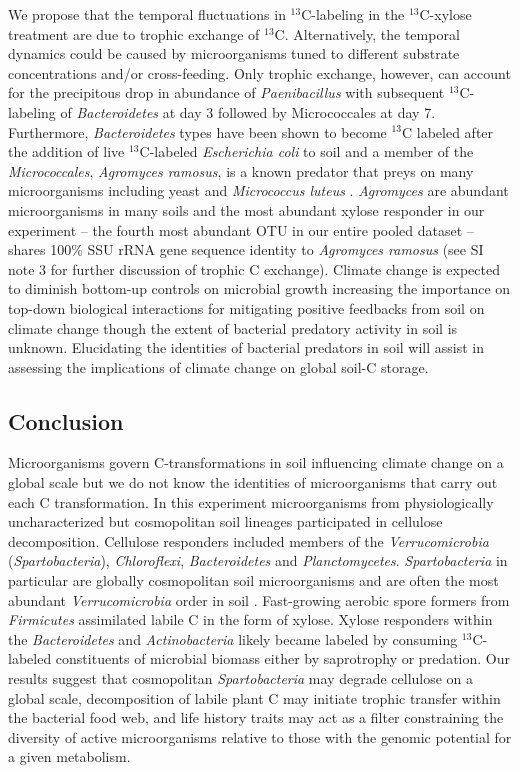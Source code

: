We propose that the temporal fluctuations in $^{13}$C-labeling in the
$^{13}$C-xylose treatment are due to trophic exchange of $^{13}$C.
Alternatively, the temporal dynamics could be caused by microorganisms tuned to
different substrate concentrations and/or cross-feeding. Only trophic exchange,
however, can account for the precipitous drop in abundance of
\textit{Paenibacillus} with subsequent $^{13}$C-labeling of
\textit{Bacteroidetes} at day 3 followed by Micrococcales at day 7.
Furthermore, \textit{Bacteroidetes} types have been shown to become $^{13}$C
labeled after the addition of live $^{13}$C-labeled \textit{Escherichia coli}
to soil \citep{Lueders2006} and a member of the \textit{Micrococcales},
\textit{Agromyces ramosus}, is a known predator that preys
on many microorganisms including yeast and \textit{Micrococcus luteus}
\citep{16346402}. \textit{Agromyces} are abundant microorganisms in many soils
and the most abundant xylose responder in our experiment -- the fourth most
abundant OTU in our entire pooled dataset -- shares 100\% SSU rRNA gene sequence
identity to \textit{Agromyces ramosus} (see SI note 3 for further discussion of
trophic C exchange). Climate change is expected to diminish bottom-up controls 
on microbial growth increasing the importance on top-down biological
interactions for mitigating positive feedbacks from soil on climate change
\citep{Crowther2015} though the extent of bacterial predatory activity in soil
is unknown. Elucidating the identities of bacterial predators in soil will
assist in assessing the implications of climate change on global soil-C
storage.

\subsection{Conclusion} 
Microorganisms govern C-transformations in soil influencing climate change on
a global scale but we do not know the identities of microorganisms that carry
out each C transformation. In this experiment microorganisms from physiologically
uncharacterized but cosmopolitan soil lineages participated in cellulose
decomposition. Cellulose responders included members of the
\textit{Verrucomicrobia} (\textit{Spartobacteria}), \textit{Chloroflexi},
\textit{Bacteroidetes} and \textit{Planctomycetes}. \textit{Spartobacteria} in
particular are globally cosmopolitan soil microorganisms and are often the most
abundant \textit{Verrucomicrobia} order in soil \citep{Bergmann_2011}.
Fast-growing aerobic spore formers from \textit{Firmicutes} assimilated labile
C in the form of xylose. Xylose responders within the \textit{Bacteroidetes}
and \textit{Actinobacteria} likely became labeled by consuming $^{13}$C-labeled
constituents of microbial biomass either by saprotrophy or predation. Our
results suggest that cosmopolitan \textit{Spartobacteria} may degrade cellulose
on a global scale, decomposition of labile plant C may initiate trophic transfer 
within the bacterial food web, and life history traits may act
as a filter constraining the diversity of active microorganisms relative to
those with the genomic potential for a given metabolism.
